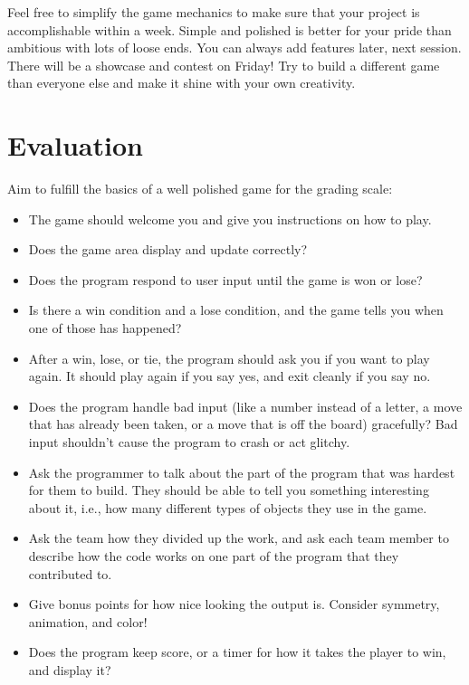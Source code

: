 \documentclass{42-en}
\begin{document}
Feel free to simplify the game mechanics to make sure that your project is accomplishable within a week. Simple and polished is better for your pride than ambitious with lots of loose ends. You can always add features later, next session.\\

There will be a showcase and contest on Friday! Try to build a different game than everyone else and make it shine with your own creativity.\\


\chapter{Evaluation}

Aim to fulfill the basics of a well polished game for the grading scale:

\begin{itemize}
	\item The game should welcome you and give you instructions on how to play.
	\item Does the game area display and update correctly?
	\item Does the program respond to user input until the game is won or lose?
	\item Is there a win condition and a lose condition, and the game tells you when one of those has happened?
	\item After a win, lose, or tie, the program should ask you if you want to play again. It should play again if you say yes, and exit cleanly if you say no.
	\item Does the program handle bad input (like a number instead of a letter, a move that has already been taken, or a move that is off the board) gracefully? Bad input shouldn't cause the program to crash or act glitchy.
	\item Ask the programmer to talk about the part of the program that was hardest for them to build. They should be able to tell you something interesting about it, i.e., how many different types of objects they use in the game.
	\item Ask the team how they divided up the work, and ask each team member to describe how the code works on one part of the program that they contributed to.
	\item Give bonus points for how nice looking the output is. Consider symmetry, animation, and color!
	\item Does the program keep score, or a timer for how it takes the player to win, and display it? 
\end{itemize}
\end{document}

